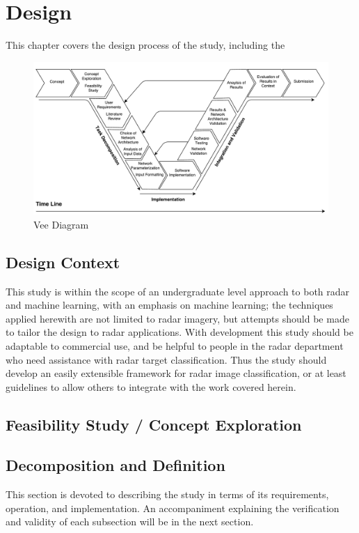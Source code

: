 \chapter{Design}
This chapter covers the design process of the study, including the 

\begin{figure}[!hb]
\centering
\includegraphics[scale=0.5]{figures/vee_diagram} %
\caption{Vee Diagram}
\label{fig:vee_diagram}
\centering
\end{figure}



\section{Design Context}
This study is within the scope of an undergraduate level approach to both radar and machine learning, with an emphasis on machine learning; the techniques applied herewith are not limited to radar imagery, but attempts should be made to tailor the design to radar applications. With development this study should be adaptable to commercial use, and be helpful to people in the radar department who need assistance with radar target classification. Thus the study should develop an easily extensible framework for radar image classification, or at least guidelines to allow others to integrate with the work covered herein.


\section{Feasibility Study / Concept Exploration}

\section{Decomposition and Definition}
This section is devoted to describing the study in terms of its requirements, operation, and implementation. An accompaniment explaining the verification and validity of each subsection will be in the next section.
